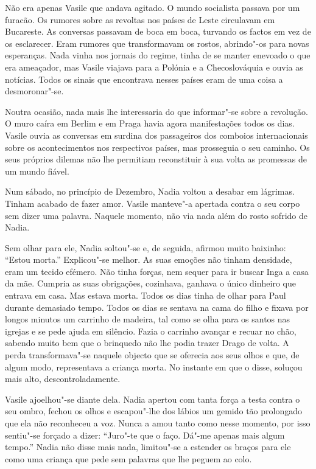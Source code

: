 \bigskip

Não era apenas Vasile que andava agitado. O mundo socialista passava por
um furacão. Os rumores sobre as revoltas nos países de Leste circulavam
em Bucareste. As conversas passavam de boca em boca, turvando os factos
em vez de os esclarecer. Eram rumores que transformavam os rostos,
abrindo"-os para novas esperanças. Nada vinha nos jornais do regime,
tinha de se manter enevoado o que era ameaçador, mas Vasile viajava para
a Polónia e a Checoslováquia e ouvia as notícias. Todos os sinais que
encontrava nesses países eram de uma coisa a desmoronar"-se.

Noutra ocasião, nada mais lhe interessaria do que informar"-se sobre a
revolução. O muro caíra em Berlim e em Praga havia agora manifestações
todos os dias. Vasile ouvia as conversas em surdina dos passageiros dos
comboios internacionais sobre os acontecimentos nos respectivos
países, mas prosseguia o seu caminho. Os seus próprios dilemas não lhe
permitiam reconstituir à sua volta as promessas de um mundo fiável.

\bigskip

Num sábado, no princípio de Dezembro, Nadia voltou a desabar em
lágrimas. Tinham acabado de fazer amor. Vasile manteve"-a apertada contra
o seu corpo sem dizer uma palavra. Naquele momento, não via nada além do
rosto sofrido de Nadia.

Sem olhar para ele, Nadia soltou"-se e, de seguida, afirmou muito
baixinho: ``Estou morta.'' Explicou"-se melhor.
As suas emoções não tinham densidade, eram um tecido efémero. Não tinha
forças, nem sequer para ir buscar Inga a casa da mãe. Cumpria as suas
obrigações, cozinhava, ganhava o único dinheiro que entrava em casa. Mas
estava morta. Todos os dias tinha de olhar para Paul durante demasiado
tempo. Todos os dias se sentava na cama do filho e fixava por longos
minutos um carrinho de madeira, tal como se olha para os santos nas
igrejas e se pede ajuda em silêncio. Fazia o carrinho avançar e recuar
no chão, sabendo muito bem que o brinquedo não lhe podia trazer Drago de
volta. A perda transformava"-se naquele objecto que se oferecia aos seus
olhos e que, de algum modo, representava a criança morta. No instante em
que o disse, soluçou mais alto, descontroladamente.

Vasile ajoelhou"-se diante dela. Nadia apertou com tanta
força a testa contra o seu ombro, fechou os olhos e escapou"-lhe dos
lábios um gemido tão prolongado que ela não reconheceu a voz. Nunca a
amou tanto como nesse momento, por isso sentiu"-se forçado a dizer:
``Juro"-te que o faço. Dá"-me apenas mais algum tempo.'' Nadia não disse
mais nada, limitou"-se a estender os braços para ele como uma criança que
pede sem palavras que lhe peguem ao colo.



